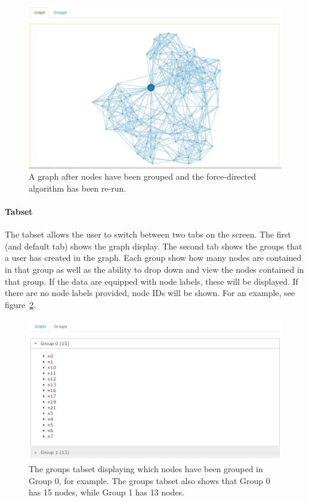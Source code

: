 \documentclass{article}\usepackage[]{graphicx}\usepackage[]{color}
\begin{document}
\begin{figure}[H]
\centering
\includegraphics[width=\textwidth]{images/graphgroup.png}
\caption{\label{fig:graphgroup} A graph after nodes have been grouped and the force-directed algorithm has been re-run.}
\end{figure}

\paragraph{Tabset}
The tabset allows the user to switch between two tabs on the screen. The first (and default tab) shows the graph display. The second tab shows the groups that a user has created in the graph. Each group show how many nodes are contained in that group as well as the ability to drop down and view the nodes contained in that group. If the data are equipped with node labels, these will be displayed. If there are no node labels provided, node IDs will be shown. For an example, see figure~\ref{fig:groupstab}.

\begin{figure}[H]
\centering
\includegraphics[width=\textwidth]{images/groupstab.png}
\caption{\label{fig:groupstab} The groups tabset displaying which nodes have been grouped in Group 0, for example. The groups tabset also shows that Group 0 has 15 nodes, while Group 1 has 13 nodes.}
\end{figure}
\end{document}
